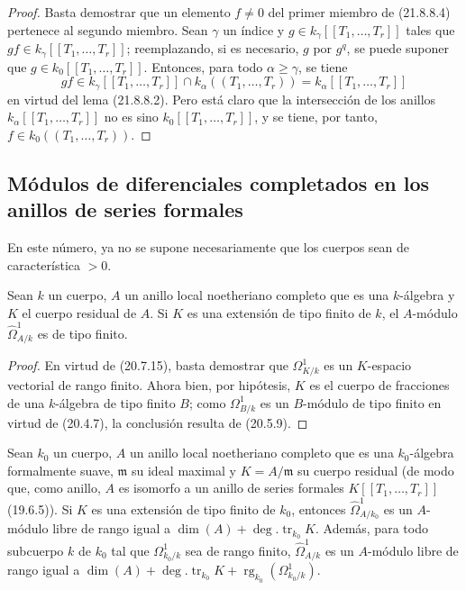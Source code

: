 \begin{proof}

Basta demostrar que un elemento $f\ne0$ del primer miembro de (21.8.8.4)
pertenece al segundo miembro. Sean $\gamma$ un índice y
$g\in k_\gamma[[T_1,\ldots,T_r]]$ tales 
que
$gf\in k_\gamma[[T_1,\ldots,T_r]]$; reemplazando, si es necesario, $g$ por
$g^q$, se puede suponer que $g\in k_0[[T_1,\ldots,T_r]]$. Entonces, para todo
$\alpha\geqslant\gamma$, se tiene
\[
  gf\in k_\gamma[[T_1,\ldots,T_r]]\cap k_\alpha((T_1,\ldots,T_r))
  =k_\alpha[[T_1,\ldots,T_r]]
\]
en virtud del lema (21.8.8.2). Pero está claro que la intersección de los
anillos $k_\alpha[[T_1,\ldots,T_r]]$ no es sino
$k_0[[T_1,\ldots,T_r]]$, y se tiene, por tanto,
$f\in k_0((T_1,\ldots,T_r))$.
\end{proof}

\subsection{Módulos de diferenciales completados en los anillos de series formales}
\label{subsection:0.21.9-fr}

En este número, ya no se supone necesariamente que los cuerpos sean de
característica $>0$.

\begin{lemma}[21.9.1]
\label{0.21.9.1-fr}
Sean $k$ un cuerpo, $A$ un anillo local noetheriano completo que es una
$k$-álgebra y $K$ el cuerpo residual de $A$. Si $K$ es una extensión de tipo
finito de $k$, el $A$-módulo $\widehat\Omega^1_{A/k}$ es de tipo finito.
\end{lemma}

\begin{proof}
En virtud de (20.7.15), basta demostrar que $\Omega^1_{K/k}$ es un
$K$-espacio vectorial de rango finito. Ahora bien, por hipótesis, $K$ es el
cuerpo de fracciones de una $k$-álgebra de tipo finito $B$; como
$\Omega^1_{B/k}$ es un $B$-módulo de tipo finito en virtud de (20.4.7), la
conclusión resulta de (20.5.9).
\end{proof}

\begin{proposition}[21.9.2]
\label{0.21.9.2-fr}
Sean $k_0$ un cuerpo, $A$ un anillo local noetheriano completo que es una
$k_0$-álgebra formalmente suave, $\mathfrak m$ su ideal maximal y
$K=A/\mathfrak m$ su cuerpo residual (de modo que, como anillo, $A$ es
isomorfo a un anillo de series formales $K[[T_1,\ldots,T_r]]$ (19.6.5)).
Si $K$ es una extensión de tipo finito de $k_0$, entonces
$\widehat\Omega^1_{A/k_0}$ es un $A$-módulo libre de rango igual a
$\dim(A)+\deg.\operatorname{tr}_{k_0}K$. Además, para todo subcuerpo $k$ de
$k_0$ tal que $\Omega^1_{k_0/k}$ sea de rango finito,
$\widehat\Omega^1_{A/k}$ es un $A$-módulo libre de rango igual a
$\dim(A)+\deg.\operatorname{tr}_{k_0}K+\operatorname{rg}_{k_0}(\Omega^1_{k_0/k})$.
\end{proposition}

